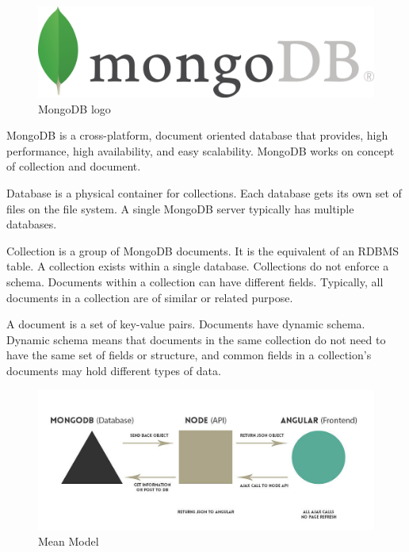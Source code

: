 \begin{figure}[h]
\centering \includegraphics[scale=1]{images/mongoPic.png}
\caption{MongoDB logo}
\end{figure}
\noindent MongoDB is a cross-platform, document oriented database that provides, high performance, high availability, and easy scalability. MongoDB works on concept of collection and document.

Database is a physical container for collections. Each database gets its own set of files on the file system. A single MongoDB server typically has multiple databases.

Collection is a group of MongoDB documents. It is the equivalent of an RDBMS table. A collection exists within a single database. Collections do not enforce a schema. Documents within a collection can have different fields. Typically, all documents in a collection are of similar or related purpose.

A document is a set of key-value pairs. Documents have dynamic schema. Dynamic schema means that documents in the same collection do not need to have the same set of fields or structure, and common fields in a collection's documents may hold different types of data.

\begin{figure}[h]
\centering \includegraphics[scale=1]{images/mongodb.jpg}
\caption{Mean Model}
\end{figure}

